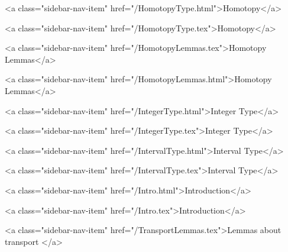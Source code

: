      
        
          <a class="sidebar-nav-item" href="/HomotopyType.html">Homotopy</a>
        
      
    
      
        
          <a class="sidebar-nav-item" href="/HomotopyType.tex">Homotopy</a>
        
      
    
      
        
          <a class="sidebar-nav-item" href="/HomotopyLemmas.tex">Homotopy Lemmas</a>
        
      
    
      
        
          <a class="sidebar-nav-item" href="/HomotopyLemmas.html">Homotopy Lemmas</a>
        
      
    
      
        
          <a class="sidebar-nav-item" href="/IntegerType.html">Integer Type</a>
        
      
    
      
        
          <a class="sidebar-nav-item" href="/IntegerType.tex">Integer Type</a>
        
      
    
      
        
          <a class="sidebar-nav-item" href="/IntervalType.html">Interval Type</a>
        
      
    
      
        
          <a class="sidebar-nav-item" href="/IntervalType.tex">Interval Type</a>
        
      
    
      
        
          <a class="sidebar-nav-item" href="/Intro.html">Introduction</a>
        
      
    
      
        
          <a class="sidebar-nav-item" href="/Intro.tex">Introduction</a>
        
      
    
      
        
          <a class="sidebar-nav-item" href="/TransportLemmas.tex">Lemmas about transport </a>
        
      
    
